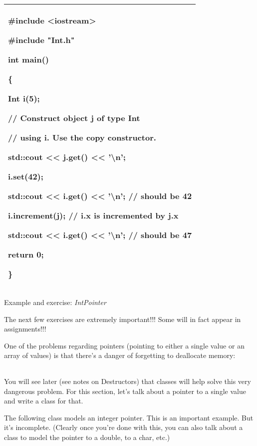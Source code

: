 \documentclass[
]{article}
\begin{document}
\begin{longtable}[]{@{}l@{}}
\toprule
\endhead
\begin{minipage}[t]{0.97\columnwidth}\raggedright
\#include \textless iostream\textgreater{}

\#include "Int.h"

int main()

\{

Int i(5);

// Construct object j of type Int

// using i. Use the copy constructor.

std::cout \textless\textless{} j.get() \textless\textless{}
'\textbackslash n';

i.set(42);

std::cout \textless\textless{} i.get() \textless\textless{}
'\textbackslash n'; // should be 42

i.increment(j); // i.x is incremented by j.x

std::cout \textless\textless{} i.get() \textless\textless{}
'\textbackslash n'; // should be 47

return 0;

\}\strut
\end{minipage}\tabularnewline
\bottomrule
\end{longtable}

Example and exercise: \emph{IntPointer}

The next few exercises are extremely important!!! Some will in fact
appear in assignments!!!

One of the problems regarding pointers (pointing to either a single
value or an array of values) is that there's a danger of forgetting to
deallocate memory:

\begin{longtable}[]{@{}@{}}
\toprule
\endhead
\bottomrule
\end{longtable}

You will see later (see notes on Destructors) that classes will help
solve this very dangerous problem. For this section, let's talk about a
pointer to a single value and write a class for that.

The following class models an integer pointer. This is an important
example. But it's incomplete. (Clearly once you're done with this, you
can also talk about a class to model the pointer to a double, to a char,
etc.)
\end{document}
